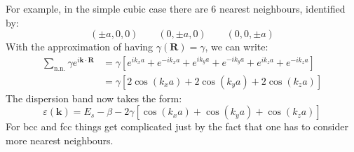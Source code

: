 \documentclass[10.75pt,a4paper,openright,bottom=2cm]{article}
\renewcommand{\Vec}[1]{\boldsymbol{#1}}
\begin{document}
For example, in the simple cubic case there are 6 nearest neighbours, identified by:
\[
(\pm a,0,0) \qquad (0,\pm a,0) \qquad (0,0,\pm a)
\]
With the approximation of having $\gamma(\Vec{R})=\gamma$, we can write:
\begin{align*}
\sum_{\text{n.n.}}\gamma e^{i\Vec{k}\cdot\Vec{R}}&=\gamma\left[e^{ik_xa}+e^{-ik_xa}+e^{ik_ya}+e^{-ik_ya}+e^{ik_za}+e^{-ik_za}\right]\\
&=\gamma\left[2\cos(k_xa)+2\cos(k_ya)+2\cos(k_za)\right]
\end{align*}
The dispersion band now takes the form:
\[
\varepsilon(\Vec{k})=E_s-\beta-2\gamma\left[\cos(k_xa)+\cos(k_ya)+\cos(k_za)\right]
\]
For bcc and fcc things get complicated just by the fact that one has to consider more nearest neighbours.
\end{document}

